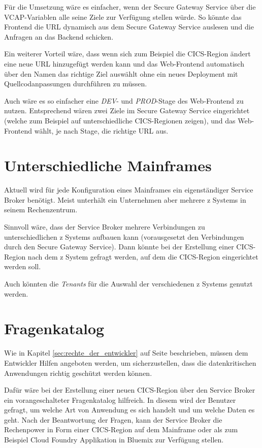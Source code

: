 Für die Umsetzung wäre es einfacher, wenn der Secure Gateway Service über die VCAP-Variablen alle seine Ziele
zur Verfügung stellen würde. So könnte das Frontend die URL dynamisch aus dem Secure Gateway Service auslesen und die
Anfragen an das Backend schicken.

Ein weiterer Vorteil wäre, dass wenn sich zum Beispiel die CICS-Region ändert eine neue URL hinzugefügt werden kann und
das Web-Frontend automatisch über den Namen das richtige Ziel auswählt ohne ein neues Deployment mit Quellcodanpassungen
durchführen zu müssen.

Auch wäre es so einfacher eine \textit{DEV}- und \textit{PROD}-Stage des Web-Frontend zu nutzen. Entsprechend wären zwei
Ziele im Secure Gateway Service eingerichtet (welche zum Beispiel auf unterschiedliche CICS-Regionen zeigen), und das
Web-Frontend wählt, je nach Stage, die richtige URL aus.

\section{Unterschiedliche Mainframes}
Aktuell wird für jede Konfiguration eines Mainframes ein eigenständiger Service Broker benötigt. Meist unterhält ein
Unternehmen aber mehrere z Systems in seinem Rechenzentrum.

Sinnvoll wäre, dass der Service Broker mehrere Verbindungen zu unterschiedlichen z Systems aufbauen kann (vorausgesetzt
den Verbindungen durch den Secure Gateway Service). Dann könnte bei der Erstellung einer CICS-Region nach dem z System
gefragt werden, auf dem die CICS-Region eingerichtet werden soll.

Auch könnten die \textit{Tenants} für die Auswahl der verschiedenen z Systems genutzt werden.

\section{Fragenkatalog}
Wie in Kapitel \ref{sec:rechte_der_entwickler} auf Seite \pageref{sec:rechte_der_entwickler} beschrieben, müssen dem
Entwickler Hilfen angeboten werden, um sicherzustellen, dass die datenkritischen Anwendungen richtig geschützt werden
können.

Dafür wäre bei der Erstellung einer neuen CICS-Region über den Service Broker ein vorangeschalteter Fragenkatalog hilfreich.
In diesem wird der Benutzer gefragt, um welche Art von Anwendung es sich handelt und um welche Daten es geht. Nach der
Beantwortung der Fragen, kann der Service Broker die Rechenpower in Form einer CICS-Region auf dem Mainframe oder
als zum Beispiel Cloud Foundry Applikation in Bluemix zur Verfügung stellen.

